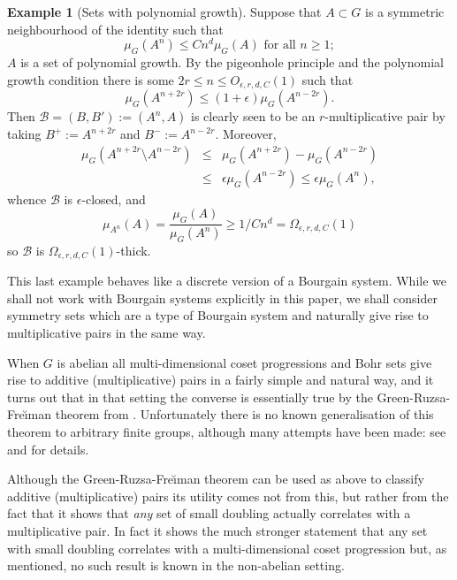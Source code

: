 \documentclass[12pt]{amsart}
\numberwithin{equation}{section}
\theoremstyle{plain}
\theoremstyle{definition}
\newtheorem{example}[subsection]{Example}
\renewcommand{\leq}{\leqslant}
\renewcommand{\geq}{\geqslant}
\begin{document}
\begin{example}[Sets with polynomial growth]\label{eg.pg}  Suppose that $A \subset G$ is a symmetric neighbourhood of the identity such that
\begin{equation*}
\mu_G(A^n) \leq Cn^d\mu_G(A) \textrm{ for all } n \geq 1;
\end{equation*}
$A$ is a set of polynomial growth.  By the pigeonhole principle and the polynomial growth condition there is some $2r \leq n \leq O_{\epsilon,r,d,C}(1)$ such that
\begin{equation*}
\mu_G(A^{n+2r}) \leq (1+\epsilon)\mu_G(A^{n-2r}).
\end{equation*}
Then $\mathcal{B}=(B,B'):=(A^{n},A)$ is clearly seen to be an $r$-multiplicative pair by taking $B^+:=A^{n+2r}$ and $B^-:=A^{n-2r}$.  Moreover,
\begin{eqnarray*}
\mu_G(A^{n+2r} \setminus A^{n-2r}) &\leq &\mu_G(A^{n+2r}) - \mu_G(A^{n-2r})\\ & \leq & \epsilon \mu_G(A^{n-2r}) \leq \epsilon \mu_G(A^{n}),
\end{eqnarray*}
 whence $\mathcal{B}$ is $\epsilon$-closed, and
\begin{equation*}
\mu_{A^n}(A) = \frac{\mu_G(A)}{\mu_G(A^n)} \geq 1/Cn^d = \Omega_{\epsilon,r,d,C}(1)
\end{equation*}
so $\mathcal{B}$ is $\Omega_{\epsilon,r,d,C}(1)$-thick.
\end{example}
This last example behaves like a discrete version of a Bourgain system.  While we shall not work with Bourgain systems explicitly in this paper, we shall consider symmetry sets which are a type of Bourgain system and naturally give rise to multiplicative pairs in the same way.

When $G$ is abelian all multi-dimensional coset progressions and Bohr sets give rise to additive (multiplicative) pairs in a fairly simple and natural way, and it turns out that in that setting the converse is essentially true by the Green-Ruzsa-Fre{\u\i}man theorem from \cite{BJGIZR}. Unfortunately there is no known generalisation of this theorem to arbitrary finite groups, although many attempts have been made: see \cite{BJGEB1,BJGEB2,DFNHKIP,EH} and \cite{TCTFrei} for details.  

Although the Green-Ruzsa-Fre{\u\i}man theorem can be used as above to classify additive (multiplicative) pairs its utility comes not from this, but rather from the fact that it shows that \emph{any} set of small doubling actually correlates with a multiplicative pair.  In fact it shows the much stronger statement that any set with small doubling correlates with a multi-dimensional coset progression but, as mentioned, no such result is known in the non-abelian setting. 
\end{document}
